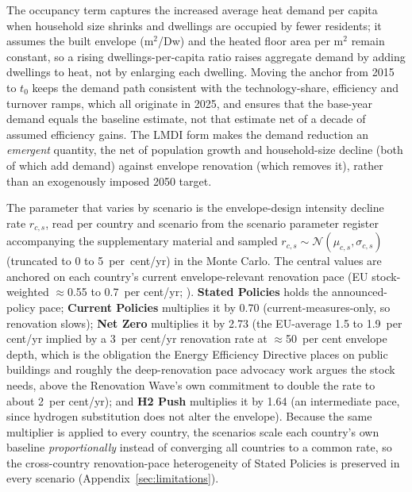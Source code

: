 The occupancy term captures the increased average heat demand per capita when household
size shrinks and dwellings are occupied by fewer residents; it assumes the built
envelope ($\text{m}^2$/Dw) and the heated floor area per $\text{m}^2$ remain constant,
so a rising dwellings-per-capita ratio raises aggregate demand by adding dwellings to
heat, not by enlarging each dwelling. Moving the anchor from 2015 to $t_0$ keeps the
demand path consistent with the technology-share, efficiency and turnover ramps, which
all originate in 2025, and ensures that the base-year demand equals the baseline
estimate, not that estimate net of a decade of assumed efficiency gains. The LMDI form
makes the demand reduction an \emph{emergent} quantity, the net of population growth and
household-size decline (both of which add demand) against envelope renovation (which
removes it), rather than an exogenously imposed 2050 target.

The parameter that varies by scenario is the envelope-design intensity decline
rate $r_{c,s}$, read
per country and scenario from the scenario parameter register accompanying the supplementary material and sampled
$r_{c,s}\sim\mathcal{N}(\mu_{c,s},\sigma_{c,s})$ (truncated to 0 to 5~per~cent/yr) in
the Monte Carlo. The central values are anchored on each country's current
envelope-relevant renovation pace (EU stock-weighted $\approx$0.55 to 0.7~per cent/yr; \citealp{BPIE2024Tracker,Esser2019renovation}). \textbf{Stated Policies} holds the
announced-policy pace; \textbf{Current Policies} multiplies it by 0.70
(current-measures-only, so renovation slows); \textbf{Net Zero} multiplies it by
2.73 (the EU-average 1.5 to 1.9~per cent/yr implied by a 3~per cent/yr renovation rate at $\approx$50~per cent envelope depth, which is the obligation the Energy Efficiency Directive places on public buildings and roughly the deep-renovation pace advocacy work argues the stock needs, above the Renovation Wave's own commitment to double the rate to about 2~per cent/yr); and \textbf{H2 Push} multiplies
it by 1.64 (an intermediate pace, since hydrogen substitution does not alter the
envelope). Because the same multiplier is applied to every country, the scenarios
scale each country's own baseline \emph{proportionally} instead of converging all
countries to a common rate, so the cross-country renovation-pace heterogeneity of
Stated Policies is preserved in every scenario (Appendix~\ref{sec:limitations}).

